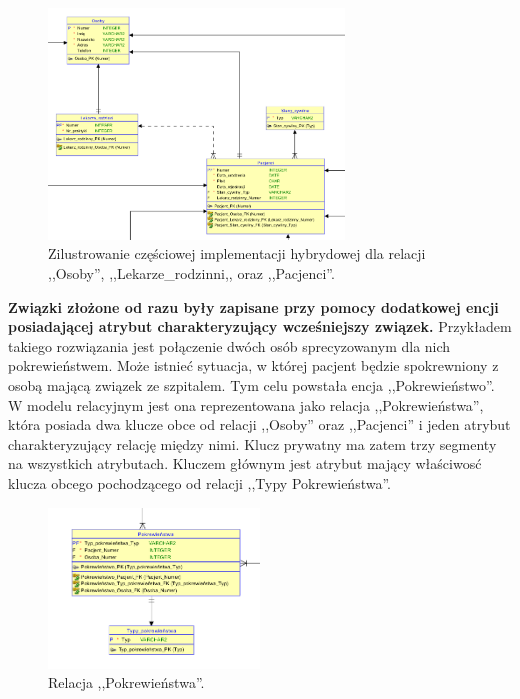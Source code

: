 \begin{figure}[H]
\centering
\includegraphics[width=0.7\textwidth]{img/podrzedne.png}
\caption{\small Zilustrowanie częściowej implementacji hybrydowej dla relacji ,,Osoby'', ,,Lekarze\_rodzinni,, oraz ,,Pacjenci''.}
\end{figure}

\clearpage

\textbf{Związki złożone od razu były zapisane przy pomocy dodatkowej encji posiadającej atrybut charakteryzujący wcześniejszy związek.} Przykładem takiego rozwiązania jest połączenie dwóch osób sprecyzowanym dla nich pokrewieństwem. Może istnieć sytuacja, w której pacjent będzie spokrewniony z osobą mającą związek ze szpitalem. Tym celu powstała encja ,,Pokrewieństwo''. W modelu relacyjnym jest ona reprezentowana jako relacja ,,Pokrewieństwa'', która posiada dwa klucze obce od relacji ,,Osoby'' oraz ,,Pacjenci'' i jeden atrybut charakteryzujący relację między nimi. Klucz prywatny ma zatem trzy segmenty na wszystkich atrybutach. Kluczem głównym jest atrybut mający właściwosć klucza obcego pochodzącego od relacji ,,Typy Pokrewieństwa''.

\begin{figure}[H]
\centering
\includegraphics[width=0.5\textwidth]{img/pokrewienstwa.png}
\caption{\small Relacja ,,Pokrewieństwa''.}
\end{figure}

